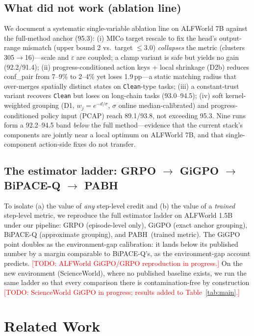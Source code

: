 \documentclass[sigconf]{acmart}
\newcommand{\method}{PABH}
\newcommand{\todo}[1]{\textcolor{red}{[TODO: #1]}}
\begin{document}
\subsection{What did not work (ablation line)}
\label{sec:pabpo}

We document a systematic single-variable ablation line on ALFWorld 7B
against the full-method anchor (95.3): (i) MICo target rescale to fix
the head's output-range mismatch (upper bound 2 vs.\ target $\le3.0$)
\emph{collapses} the metric (clusters 305$\to$16)---scale and
$\varepsilon$ are coupled; a clamp variant is safe but yields no gain
(92.2/91.4); (ii) progress-conditioned action keys + local shrinkage
(D2b) reduces conf\_pair from 7--9\% to 2--4\% yet loses 1.9\,pp---a
static matching radius that over-merges spatially distinct states on
\texttt{Clean}-type tasks; (iii) a constant-trust variant recovers
\texttt{Clean} but loses on long-chain tasks (93.0--94.5); (iv) soft
kernel-weighted grouping (D1, $w_j=e^{-d/\sigma}$, $\sigma$ online
median-calibrated) and progress-conditioned policy input (PCAP) reach
89.1/93.8, not exceeding 95.3. Nine runs form a 92.2--94.5 band
\emph{below} the full method---evidence that the current stack's
components are jointly near a local optimum on ALFWorld 7B, and that
single-component action-side fixes do not transfer.

\subsection{The estimator ladder: GRPO $\to$ GiGPO $\to$ BiPACE-Q $\to$ \method}
\label{sec:gigpo_repro}

To isolate (a) the value of \emph{any} step-level credit and (b) the
value of a \emph{trained} step-level metric, we reproduce the full
estimator ladder on ALFWorld 1.5B under our pipeline: GRPO
(episode-level only), GiGPO (exact anchor grouping), BiPACE-Q
(approximate grouping), and \method\ (trained metric). The GiGPO point
doubles as the environment-gap calibration: it lands below its
published number by a margin comparable to BiPACE-Q's, as the
environment-gap account predicts.
\todo{ALFWorld GiGPO/GRPO reproduction in progress.}
On the new environment (ScienceWorld), where no published baseline
exists, we run the same ladder so that every comparison there is
contamination-free by construction
\todo{ScienceWorld GiGPO in progress; results added to
Table~\ref{tab:main}.}

\section{Related Work}
\label{sec:related}
\end{document}
